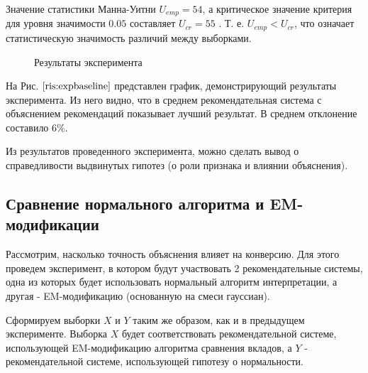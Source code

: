 \documentclass[12pt,a4paper]{report}
\begin{document}
Значение статистики Манна-Уитни $U_{emp} = 54$, а критическое значение критерия для уровня значимости $0.05$ составляет $U_{cr} = 55$ \cite{Mw}. Т. е. $U_{emp} < U_{cr}$, что означает статистическую значимость различий между выборками.

\begin{figure}[H]
\caption{Результаты эксперимента}
\label{ris:expbaseline}
\end{figure}

На Рис. $\ref{ris:expbaseline}$ представлен график, демонстрирующий результаты эксперимента. Из него видно, что в среднем рекомендательная система с объяснением рекомендаций показывает лучший результат. В среднем отклонение составило 6\%.

Из результатов проведенного эксперимента, можно сделать вывод о справедливости выдвинутых гипотез (о роли признака и влиянии объяснения).

\subsection{Сравнение нормального алгоритма и  EM-модификации}
Рассмотрим, насколько точность объяснения влияет на конверсию. Для этого проведем эксперимент, в котором будут участвовать 2 рекомендательные системы, одна из которых будет использовать нормальный алгоритм интерпретации, а другая - EM-модификацию (основанную на смеси гауссиан).

Сформируем выборки $X$ и $Y$ таким же образом, как и в предыдущем эксперименте. Выборка $X$ будет соответствовать рекомендательной системе, использующей EM-модификацию алгоритма сравнения вкладов, а $Y$ - рекомендательной системе, использующей гипотезу о нормальности. 
\end{document}
